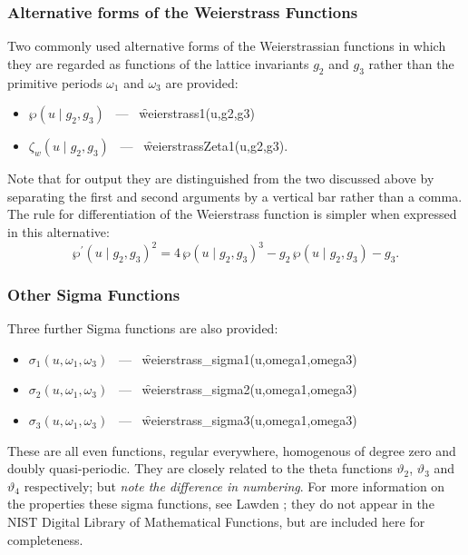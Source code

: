 \subsubsection{Alternative forms of the Weierstrass Functions}
\hypertarget{WEIERSTRASS1}{}
\hypertarget{WEIERSTRASSZETA1}{}
\hypertarget{operator:WEIERSTRASS1}{}
\hypertarget{operator:WEIERSTRASSZETA1}{}
 

Two commonly used alternative forms of the Weierstrassian functions in which
they are regarded as functions of the lattice invariants $g_2$ and $g_3$
rather than the primitive periods $\omega_1$ and $\omega_3$ are provided:
\begin{itemize}
\item  $\wp(u \mid g_2, g_3)$ \ --- \ \f{weierstrass1(u,g2,g3)}
\item $\zeta_w(u \mid g_2, g_3)$ \ --- \ \f{weierstrassZeta1(u,g2,g3)}.
\end{itemize}
Note that for output they are distinguished from the two discussed above
by separating the first and
second arguments by a vertical bar rather than a comma. The rule for
differentiation of the Weierstrass function is simpler when expressed in
this  alternative:
\[ \wp^\prime(u \mid g_2,g_3)^2 = 4\,\wp(u \mid g_2,g_3)^3
   - g_2\, \wp(u \mid g_2,g_3) -g_3. \]

\subsubsection{Other Sigma Functions}
\hypertarget{SIGMA1}{}
\hypertarget{operator:WEIERSTRASS_SIGMA1}{}
\hypertarget{operator:WEIERSTRASS_SIGMA2}{}
\hypertarget{operator:WEIERSTRASS_SIGMA3}{}

Three further Sigma functions are also provided:
\begin{itemize}
\item $\sigma_1(u, \omega_1, \omega_3)$ \ --- \ \f{weierstrass\_sigma1(u,omega1,omega3)}
\item $\sigma_2(u, \omega_1, \omega_3)$ \ --- \ \f{weierstrass\_sigma2(u,omega1,omega3)}
\item $\sigma_3(u, \omega_1, \omega_3)$ \ --- \ \f{weierstrass\_sigma3(u,omega1,omega3)}
\end{itemize}
These are all even functions, regular everywhere, homogenous of degree zero and doubly quasi-periodic. They are closely related to the
theta functions $\vartheta_2$, $\vartheta_3$ and $\vartheta_4$ respectively; but \emph{note the difference in numbering}.
For more information on the properties these sigma functions, see Lawden \cite{Lawden:89};
they do not appear in the NIST Digital Library of Mathematical Functions, but are included here for completeness.

